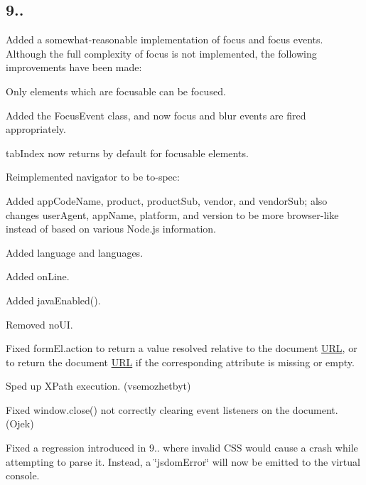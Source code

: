\subsection*{9..}


\begin{DoxyItemize}
\item Added a somewhat-\/reasonable implementation of focus and focus events. Although the full complexity of focus is not implemented, the following improvements have been made\+:
\begin{DoxyItemize}
\item Only elements which are focusable can be focused.
\item Added the {\ttfamily Focus\+Event} class, and now {\ttfamily focus} and {\ttfamily blur} events are fired appropriately.
\item {\ttfamily tab\+Index} now returns {} by default for focusable elements.
\end{DoxyItemize}
\item Reimplemented {\ttfamily navigator} to be to-\/spec\+:
\begin{DoxyItemize}
\item Added {\ttfamily app\+Code\+Name}, {\ttfamily product}, {\ttfamily product\+Sub}, {\ttfamily vendor}, and {\ttfamily vendor\+Sub}; also changes {\ttfamily user\+Agent}, {\ttfamily app\+Name}, {\ttfamily platform}, and {\ttfamily version} to be more browser-\/like instead of based on various Node.\+js information.
\item Added {\ttfamily language} and {\ttfamily languages}.
\item Added {\ttfamily on\+Line}.
\item Added {\ttfamily java\+Enabled()}.
\item Removed {\ttfamily no\+UI}.
\end{DoxyItemize}
\item Fixed {\ttfamily form\+El.\+action} to return a value resolved relative to the document \mbox{\hyperlink{namespace_u_r_l}{U\+RL}}, or to return the document \mbox{\hyperlink{namespace_u_r_l}{U\+RL}} if the corresponding attribute is missing or empty.
\item Sped up X\+Path execution. (vsemozhetbyt)
\item Fixed {\ttfamily window.\+close()} not correctly clearing event listeners on the document. (Ojek)
\item Fixed a regression introduced in 9.. where invalid C\+SS would cause a crash while attempting to parse it. Instead, a {\ttfamily \char`\"{}jsdom\+Error\char`\"{}} will now be emitted to the virtual console.
\end{DoxyItemize}

